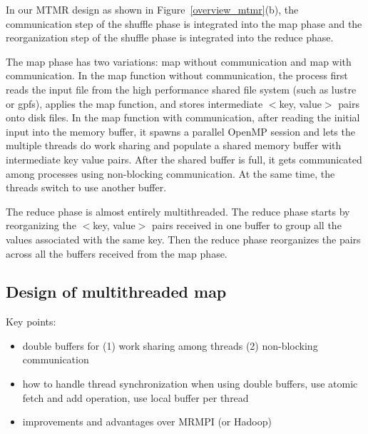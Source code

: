 \documentclass[10pt,conference,compsocconf]{IEEEtran}
\begin{document}
In our MTMR design as shown in Figure~\ref{overview_mtmr}(b),
the communication step of the shuffle phase is integrated into
the map phase and the reorganization step of the shuffle phase
is integrated into the reduce phase.

The map phase has two variations: map without communication and map
with communication. In the map function without communication, the process
first reads the input file from the high performance shared file system (such as
lustre or gpfs), applies the map function, and stores intermediate $<$key, value$>$ 
pairs onto disk files. In the map function with communication, after reading
the initial input into the memory buffer, it spawns a parallel OpenMP
session and lets the multiple threads do work sharing and populate
a shared memory buffer with intermediate key value pairs. After the shared
buffer is full, it gets communicated among processes using non-blocking
communication. At the same time, the threads switch to use another buffer.

The reduce phase is almost entirely multithreaded. The reduce phase starts
by reorganizing the $<$key, value$>$ pairs received in one buffer to group
all the values associated with the same key. Then the reduce phase
reorganizes the pairs across all the buffers received from the map phase.
 

\subsection{Design of multithreaded map}

Key points:
\begin{itemize}
\item double buffers for (1) work sharing among threads (2) non-blocking 
communication
\item how to handle thread synchronization when using double buffers,
use atomic fetch and add operation, use local buffer per thread
\item improvements and advantages over MRMPI (or Hadoop)
\end{itemize}
\end{document}
